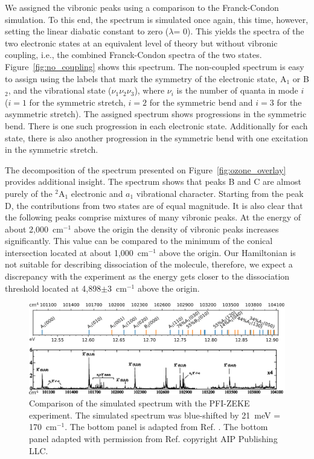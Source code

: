 \documentclass[12pt,prb,aps]{revtex4}
\begin{document}
We assigned the vibronic peaks using a comparison to the Franck-Condon
simulation. To this end, the spectrum is simulated once again, this time,
however, setting the linear diabatic constant to zero ($\lambda$= 0).
This yields the spectra of the two electronic states 
at an equivalent level of theory but without vibronic coupling, i.e., the
combined Franck-Condon spectra of the two states.  
Figure~\ref{fig:no_coupling} shows this spectrum.
The non-coupled spectrum is easy to assign using the labels that mark the
symmetry of the electronic state, A$_1$ or B$_2$, and the vibrational state
($\nu _1 \nu_2 \nu_3$), where $\nu _i$ is the number of quanta in mode $i$
($i=1$ for the symmetric stretch, $i=2$ for the symmetric bend and $i=3$
for the asymmetric stretch). The assigned spectrum shows progressions in the
symmetric bend. There is one such progression in each electronic state.
Additionally for each state, there is also another progression in the
symmetric bend with one excitation in the symmetric stretch.

The decomposition of the spectrum presented on Figure~\ref{fig:ozone_overlay}
provides additional insight. The spectrum shows that peaks B and C are
almost purely of the $^2$A$_1$ electronic and $a_1$ vibrational character.
Starting from the peak D, the contributions from two states are of equal
magnitude. It is also clear that the following peaks comprise mixtures of many
vibronic peaks. At the energy of about 2,000~cm$^{-1}$ above the origin the
density of vibronic peaks increases significantly. This value can be compared
to the minimum of the conical intersection located at about 1,000~cm$^{-1}$
above the origin. Our Hamiltonian  is not suitable for describing dissociation of the
molecule, therefore, we expect a discrepancy with the experiment as the energy
gets closer to the dissociation threshold located at 4,898$\pm$3~cm$^{-1}$
above the origin.~\cite{Willitsch:O3ZEKE:2005}

\begin{figure}[h!]
\includegraphics[width=16 cm]{./figures/sim_vs_zeke.png}
\caption{
        Comparison of the simulated spectrum with the PFI-ZEKE
        experiment.\cite{Willitsch:O3ZEKE:2005} The simulated spectrum was
        blue-shifted by 21~meV = 170~cm$^{-1}$. The bottom panel is adapted from 
        Ref. .
        The bottom panel adapted with permission from Ref.  copyright AIP Publishing LLC.
    \label{fig:sim_vs_zeke}}
\end{figure}
\end{document}
